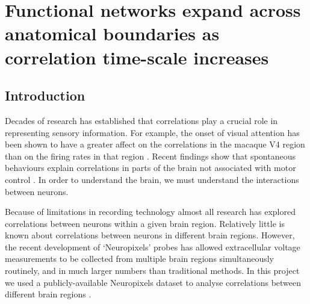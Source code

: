 \chapter{Functional networks expand across anatomical boundaries as correlation time-scale increases}

\label{chap:eight_probe}


\section{Introduction}
Decades of research has established that correlations play a crucial role in representing sensory information. For example, the onset of visual attention has been shown to have a greater affect on the correlations in the macaque V4 region than on the firing rates in that region  \parencite{cohen1}. Recent findings show that spontaneous behaviours explain correlations in parts of the brain not associated with motor control  \parencite{stringer}. In order to understand the brain, we must understand the interactions between neurons.

Because of limitations in recording technology almost all research has explored correlations between neurons within a given brain region. Relatively little is known about correlations between neurons in different brain regions. However, the recent development of `Neuropixels' probes  \parencite{jun} has allowed extracellular voltage measurements to be collected from multiple brain regions simultaneously routinely, and in much larger numbers than traditional methods. In this project we used a publicly-available Neuropixels dataset to analyse correlations between different brain regions  \parencite{stringer}.

